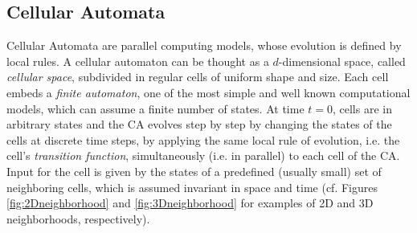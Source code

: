 \subsection{Cellular Automata}
    Cellular Automata are parallel computing models, whose evolution
    is defined by local rules. A cellular automaton can be thought as
    a $d$-dimensional space, called \emph{cellular space}, subdivided
    in regular cells of uniform shape and size. Each cell embeds a
    \emph{finite automaton}, one of the most simple and well known
    computational models, which can assume a finite number of
    states. At time $t=0$, cells are in arbitrary states and the CA
    evolves step by step by changing the states of the cells at
    discrete time steps, by applying the same local rule of evolution,
    i.e. the cell's \emph{transition function}, simultaneously
    (i.e. in parallel) to each cell of the CA. Input for the cell is
    given by the states of a predefined (usually small) set of
    neighboring cells, which is assumed invariant in space and time
    (cf. Figures \ref{fig:2Dneighborhood} and \ref{fig:3Dneighborhood}
    for examples of 2D and 3D neighborhoods, respectively).



